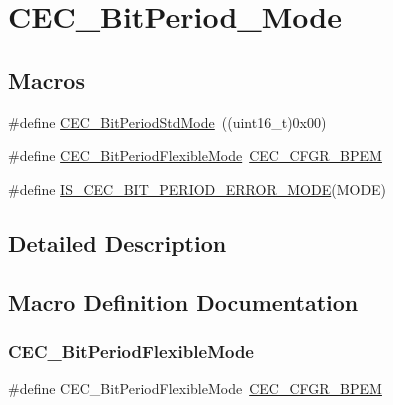 \hypertarget{group___c_e_c___bit_period___mode}{}\section{C\+E\+C\+\_\+\+Bit\+Period\+\_\+\+Mode}
\label{group___c_e_c___bit_period___mode}
\subsection*{Macros}
\begin{DoxyCompactItemize}
\item 
\#define \mbox{\hyperlink{group___c_e_c___bit_period___mode_ga746ce0a831dfd76a47add310662c7f07}{C\+E\+C\+\_\+\+Bit\+Period\+Std\+Mode}}~((uint16\+\_\+t)0x00)
\item 
\#define \mbox{\hyperlink{group___c_e_c___bit_period___mode_ga5bf4c1b257b837770d4d59c93cca6902}{C\+E\+C\+\_\+\+Bit\+Period\+Flexible\+Mode}}~\mbox{\hyperlink{group___peripheral___registers___bits___definition_ga48c747693ec4dac8e4288ae4c0949def}{C\+E\+C\+\_\+\+C\+F\+G\+R\+\_\+\+B\+P\+EM}}
\item 
\#define \mbox{\hyperlink{group___c_e_c___bit_period___mode_ga3414347854a83bf70748624ec5b8dd49}{I\+S\+\_\+\+C\+E\+C\+\_\+\+B\+I\+T\+\_\+\+P\+E\+R\+I\+O\+D\+\_\+\+E\+R\+R\+O\+R\+\_\+\+M\+O\+DE}}(M\+O\+DE)
\end{DoxyCompactItemize}


\subsection{Detailed Description}


\subsection{Macro Definition Documentation}
\mbox{\label{group___c_e_c___bit_period___mode_ga5bf4c1b257b837770d4d59c93cca6902}} 
\subsubsection{\texorpdfstring{CEC\_BitPeriodFlexibleMode}{CEC\_BitPeriodFlexibleMode}}
{\footnotesize\ttfamily \#define C\+E\+C\+\_\+\+Bit\+Period\+Flexible\+Mode~\mbox{\hyperlink{group___peripheral___registers___bits___definition_ga48c747693ec4dac8e4288ae4c0949def}{C\+E\+C\+\_\+\+C\+F\+G\+R\+\_\+\+B\+P\+EM}}}


